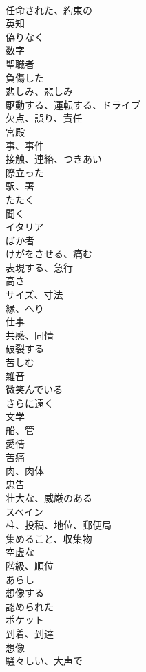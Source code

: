 \documentclass[8pt]{extreport}
\begin{document}
\begin{CJK}{UTF8}{min}
\\	任命された、約束の
\\	英知
\\	偽りなく
\\	数字
\\	聖職者
\\	負傷した
\\	悲しみ、悲しみ
\\	駆動する、運転する、ドライブ
\\	欠点、誤り、責任
\\	宮殿
\\	事、事件
\\	接触、連絡、つきあい
\\	際立った
\\	駅、署
\\	たたく
\\	聞く
\\	イタリア
\\	ばか者
\\	けがをさせる、痛む
\\	表現する、急行
\\	高さ
\\	サイズ、寸法
\\	縁、へり
\\	仕事
\\	共感、同情
\\	破裂する
\\	苦しむ
\\	雑音
\\	微笑んでいる
\\	さらに遠く
\\	文学
\\	船、管
\\	愛情
\\	苦痛
\\	肉、肉体
\\	忠告
\\	壮大な、威厳のある
\\	スペイン
\\	柱、投稿、地位、郵便局
\\	集めること、収集物
\\	空虚な
\\	階級、順位
\\	あらし
\\	想像する
\\	認められた
\\	ポケット
\\	到着、到達
\\	想像
\\	騒々しい、大声で

\end{CJK}
\end{document}
